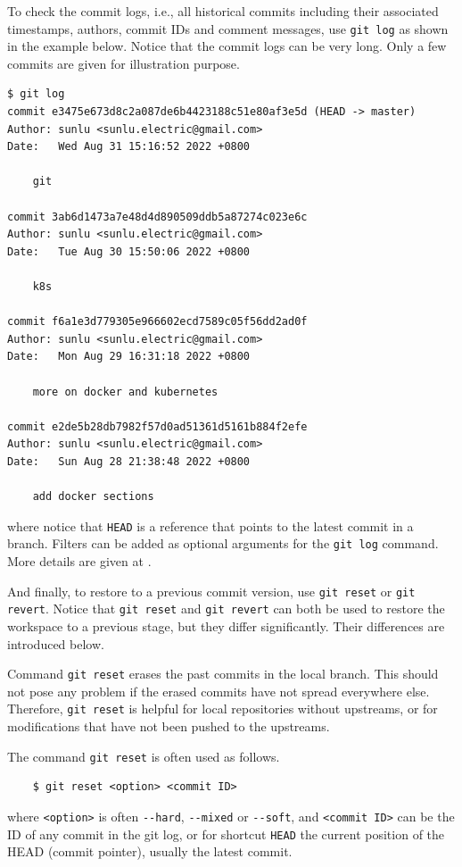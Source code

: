 To check the commit logs, i.e., all historical commits including their associated timestamps, authors, commit IDs and comment messages, use \verb|git log| as shown in the example below. Notice that the commit logs can be very long. Only a few commits are given for illustration purpose.
\begin{lstlisting}
$ git log
commit e3475e673d8c2a087de6b4423188c51e80af3e5d (HEAD -> master)
Author: sunlu <sunlu.electric@gmail.com>
Date:   Wed Aug 31 15:16:52 2022 +0800

    git

commit 3ab6d1473a7e48d4d890509ddb5a87274c023e6c
Author: sunlu <sunlu.electric@gmail.com>
Date:   Tue Aug 30 15:50:06 2022 +0800

    k8s

commit f6a1e3d779305e966602ecd7589c05f56dd2ad0f
Author: sunlu <sunlu.electric@gmail.com>
Date:   Mon Aug 29 16:31:18 2022 +0800

    more on docker and kubernetes

commit e2de5b28db7982f57d0ad51361d5161b884f2efe
Author: sunlu <sunlu.electric@gmail.com>
Date:   Sun Aug 28 21:38:48 2022 +0800

    add docker sections
\end{lstlisting}
where notice that \verb|HEAD| is a reference that points to the latest commit in a branch. Filters can be added as optional arguments for the \verb|git log| command. More details are given at \cite{git2025reference}.

And finally, to restore to a previous commit version, use \verb|git reset| or \verb|git revert|. Notice that \verb|git reset| and \verb|git revert| can both be used to restore the workspace to a previous stage, but they differ significantly. Their differences are introduced below.

Command \verb|git reset| erases the past commits in the local branch. This should not pose any problem if the erased commits have not spread everywhere else. Therefore, \verb|git reset| is helpful for local repositories without upstreams, or for modifications that have not been pushed to the upstreams. 

The command \verb|git reset| is often used as follows.
\begin{lstlisting}
	$ git reset <option> <commit ID>
\end{lstlisting}
where \verb|<option>| is often \verb|--hard|, \verb|--mixed| or \verb|--soft|, and \verb|<commit ID>| can be the ID of any commit in the git log, or for shortcut \verb|HEAD| the current position of the HEAD (commit pointer), usually the latest commit.

